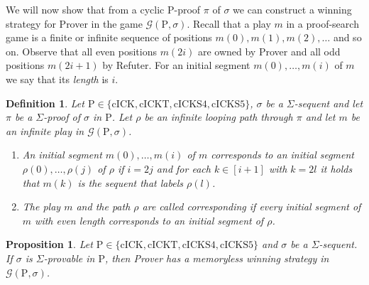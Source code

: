 \documentclass{myifcolog}
\newcommand{\hickp}{\mathrm{P}}
\newcommand{\cick}{\mathrm{cICK}}
\newcommand{\cickt}{\mathrm{cICKT}}
\newcommand{\cicks}{\mathrm{cICKS4}}
\newcommand{\cickss}{\mathrm{cICKS5}}
\newtheorem{definition}[theorem]{Definition}
\newtheorem{proposition}[theorem]{Proposition}
\numberwithin{theorem}{section}
\begin{document}
      
	 We will now show that from a cyclic $\hickp$-proof $\pi$ of $\sigma$ we can construct a winning strategy for Prover in the game $\mathscr{G}(\hickp, \sigma)$. Recall that a play $m$ in a proof-search game is a finite or infinite sequence of positions $m(0),m(1),m(2), \ldots$ and so on. Observe that all even positions $m(2i)$ are owned by Prover and all odd positions $m(2i+1)$ by Refuter. For an initial segment $m(0), \ldots, m(i)$ of $m$ we say that its \emph{length} is $i$.
	
	\begin{definition}
	Let $\hickp \in \{\cick, \cickt, \cicks, \cickss\}$, $\sigma$ be a $\Sigma$-sequent and let $\pi$ be a $\Sigma$-proof of $\sigma$ in $\hickp$. Let $\rho$ be an infinite looping path through $\pi$ and let $m$ be an infinite play in $\mathscr{G}(\hickp,\sigma)$.
	\begin{enumerate}
	    \item An initial segment $m(0), \ldots, m(i)$ of $m$ \emph{corresponds} to an initial segment $\rho(0), \ldots, \rho(j)$ of $\rho$ if $i = 2j$ and for each $k \in [i+1]$ with $k = 2l$ it holds that $m(k)$ is the sequent that labels $\rho(l)$.
	    \item The play $m$ and the path $\rho$ are called \emph{corresponding} if every initial segment of $m$ with even length corresponds to an initial segment of $\rho$.
	\end{enumerate}
	\end{definition}
	
	


     \begin{proposition}\label{p: provable implies winning strategy}
		Let $\hickp \in \{\cick, \cickt, \cicks, \cickss\}$ and $\sigma$ be a $\Sigma$-sequent. If $\sigma$ is $\Sigma$-provable in $\hickp$, then Prover has a memoryless winning strategy in $\mathscr{G}(\hickp,\sigma)$.
	\end{proposition}
	
\end{document}
